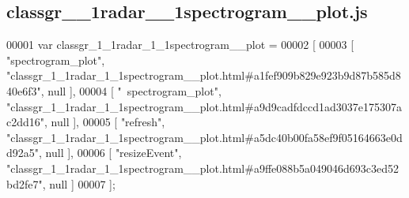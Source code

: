 \subsection{classgr\+\_\+\_\+1radar\+\_\+\_\+1spectrogram\+\_\+\+\_\+plot.\+js}
\label{classgr__1__1radar__1__1spectrogram____plot_8js_source}

\begin{DoxyCode}
00001 var classgr_1_1radar_1_1spectrogram__plot =
00002 [
00003     [ \textcolor{stringliteral}{"spectrogram\_plot"}, \textcolor{stringliteral}{"classgr\_1\_1radar\_1\_1spectrogram\_\_plot.html#a1fef909b829e923b9d87b585d840e6f3"}, 
      null ],
00004     [ \textcolor{stringliteral}{"~spectrogram\_plot"}, \textcolor{stringliteral}{"classgr\_1\_1radar\_1\_1spectrogram\_\_plot.html#a9d9cadfdccd1ad3037e175307ac2dd16"}, 
      null ],
00005     [ \textcolor{stringliteral}{"refresh"}, \textcolor{stringliteral}{"classgr\_1\_1radar\_1\_1spectrogram\_\_plot.html#a5dc40b00fa58ef9f05164663e0dd92a5"}, null ],
00006     [ \textcolor{stringliteral}{"resizeEvent"}, \textcolor{stringliteral}{"classgr\_1\_1radar\_1\_1spectrogram\_\_plot.html#a9ffe088b5a049046d693c3ed52bd2fe7"}, null ]
00007 ];
\end{DoxyCode}
